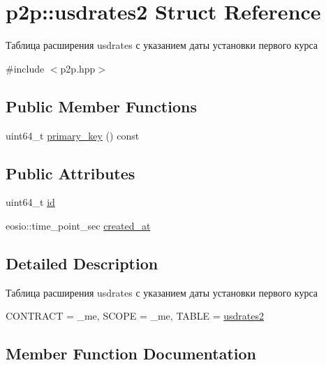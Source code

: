 \hypertarget{structp2p_1_1usdrates2}{}\section{p2p\+:\+:usdrates2 Struct Reference}
\label{structp2p_1_1usdrates2}


Таблица расширения usdrates с указанием даты установки первого курса  




{\ttfamily \#include $<$p2p.\+hpp$>$}

\subsection*{Public Member Functions}
\begin{DoxyCompactItemize}
\item 
uint64\+\_\+t \mbox{\hyperlink{structp2p_1_1usdrates2_aa3556a870e531f2a33d3a40ba45bc2da}{primary\+\_\+key}} () const
\end{DoxyCompactItemize}
\subsection*{Public Attributes}
\begin{DoxyCompactItemize}
\item 
uint64\+\_\+t \mbox{\hyperlink{structp2p_1_1usdrates2_aba230f3a86e3c9eb693c41d501378c22}{id}}
\item 
eosio\+::time\+\_\+point\+\_\+sec \mbox{\hyperlink{structp2p_1_1usdrates2_a2f8aa31571d84a178259fa42461cf140}{created\+\_\+at}}
\end{DoxyCompactItemize}


\subsection{Detailed Description}
Таблица расширения usdrates с указанием даты установки первого курса 

C\+O\+N\+T\+R\+A\+CT = \+\_\+me, S\+C\+O\+PE = \+\_\+me, T\+A\+B\+LE = \mbox{\hyperlink{structp2p_1_1usdrates2}{usdrates2}} 

\subsection{Member Function Documentation}
\mbox{\label{structp2p_1_1usdrates2_aa3556a870e531f2a33d3a40ba45bc2da}} 
